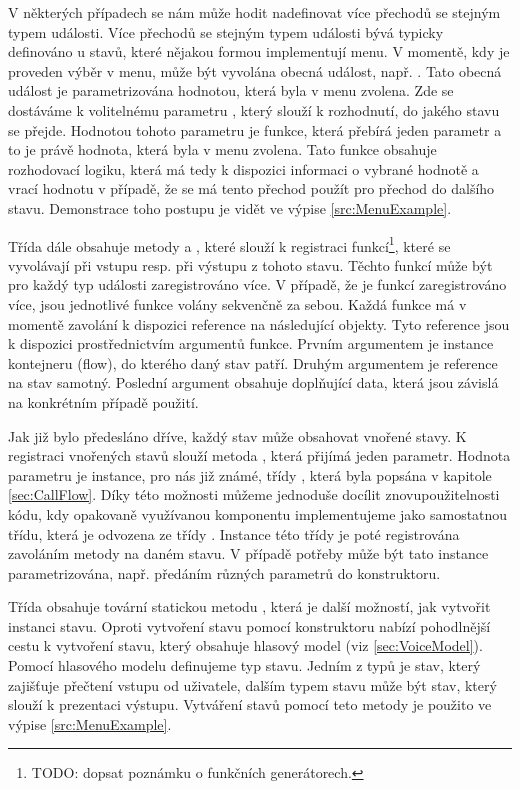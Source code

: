 \documentclass[ing,male,java,dept460]{diploma}						%
\begin{document}
V některých případech se nám může hodit nadefinovat více přechodů se stejným typem události. Více přechodů se stejným typem události bývá typicky definováno u stavů, které nějakou formou implementují menu. V momentě, kdy je proveden výběr v menu, může být vyvolána obecná událost, např. . Tato obecná událost je parametrizována hodnotou, která byla v menu zvolena. Zde se dostáváme k volitelnému parametru , který slouží k rozhodnutí, do jakého stavu se přejde. Hodnotou tohoto parametru je funkce, která přebírá jeden parametr a to je právě hodnota, která byla v menu zvolena. Tato funkce obsahuje rozhodovací logiku, která má tedy k dispozici informaci o vybrané hodnotě a vrací hodnotu  v případě, že se má tento přechod použít pro přechod do dalšího stavu. Demonstrace toho postupu je vidět ve výpise \ref{src:MenuExample}.

Třída dále obsahuje metody  a , které slouží k registraci funkcí\footnote{TODO: dopsat poznámku o funkčních generátorech.}, které se vyvolávají při vstupu resp. při výstupu z tohoto stavu. Těchto funkcí může být pro každý typ události zaregistrováno více. V případě, že je funkcí zaregistrováno více, jsou jednotlivé funkce volány sekvenčně za sebou. Každá funkce má v momentě zavolání k dispozici reference na následující objekty. Tyto reference jsou k dispozici prostřednictvím argumentů funkce. Prvním argumentem je instance kontejneru (flow), do kterého daný stav patří. Druhým argumentem je reference na stav samotný. Poslední argument obsahuje doplňující data, která jsou závislá na konkrétním případě použití.

Jak již bylo předesláno dříve, každý stav může obsahovat vnořené stavy. K registraci vnořených stavů slouží metoda , která přijímá jeden parametr. Hodnota parametru  je instance, pro nás již známé, třídy , která byla popsána v kapitole \ref{sec:CallFlow}. Díky této možnosti můžeme jednoduše docílit znovupoužitelnosti kódu, kdy opakovaně využívanou komponentu implementujeme jako samostatnou třídu, která je odvozena ze třídy . Instance této třídy je poté registrována zavoláním metody  na daném stavu. V případě potřeby může být tato instance parametrizována, např. předáním různých parametrů do konstruktoru.

Třída  obsahuje tovární statickou metodu , která je další možností, jak vytvořit instanci stavu. Oproti vytvoření stavu pomocí konstruktoru nabízí pohodlnější cestu k vytvoření stavu, který obsahuje hlasový model (viz \ref{sec:VoiceModel}). Pomocí hlasového modelu definujeme typ stavu. Jedním z typů je stav, který zajišťuje přečtení vstupu od uživatele, dalším typem stavu může být stav, který slouží k prezentaci výstupu. Vytváření stavů pomocí teto metody je použito ve výpise \ref{src:MenuExample}.
\end{document}
